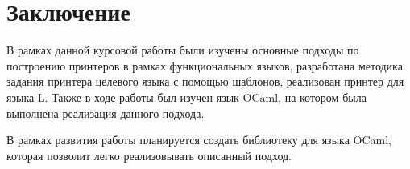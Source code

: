 \section{Заключение}

В рамках данной курсовой работы были изучены основные подходы по построению принтеров в рамках функциональных языков, разработана методика задания принтера целевого языка с помощью шаблонов, реализован принтер для языка L. Также в ходе работы был изучен язык OCaml, на котором была выполнена реализация данного подхода.

В рамках развития работы планируется создать библиотеку для языка OCaml, которая позволит легко реализовывать описанный подход.